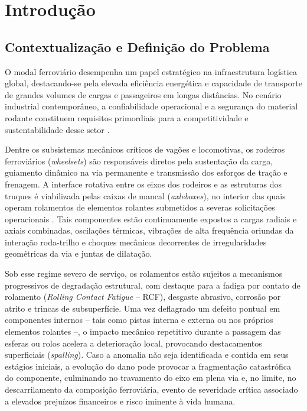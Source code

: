 \chapter{Introdução}
\label{cap:introducao}

\section{Contextualização e Definição do Problema}
\label{sec:contextualizacao}

O modal ferroviário desempenha um papel estratégico na infraestrutura logística global, destacando-se pela elevada eficiência energética e capacidade de transporte de grandes volumes de cargas e passageiros em longas distâncias. No cenário industrial contemporâneo, a confiabilidade operacional e a segurança do material rodante constituem requisitos primordiais para a competitividade e sustentabilidade desse setor \cite{smith2015rolling}.

Dentre os subsistemas mecânicos críticos de vagões e locomotivas, os rodeiros ferroviários (\textit{wheelsets}) são responsáveis diretos pela sustentação da carga, guiamento dinâmico na via permanente e transmissão dos esforços de tração e frenagem. A interface rotativa entre os eixos dos rodeiros e as estruturas dos truques é viabilizada pelas caixas de mancal (\textit{axleboxes}), no interior das quais operam rolamentos de elementos rolantes submetidos a severas solicitações operacionais \cite{randall2011rolling}. Tais componentes estão continuamente expostos a cargas radiais e axiais combinadas, oscilações térmicas, vibrações de alta frequência oriundas da interação roda-trilho e choques mecânicos decorrentes de irregularidades geométricas da via e juntas de dilatação.

Sob esse regime severo de serviço, os rolamentos estão sujeitos a mecanismos progressivos de degradação estrutural, com destaque para a fadiga por contato de rolamento (\textit{Rolling Contact Fatigue} -- RCF), desgaste abrasivo, corrosão por atrito e trincas de subsuperfície. Uma vez deflagrado um defeito pontual em componentes internos -- tais como pistas interna e externa ou nos próprios elementos rolantes --, o impacto mecânico repetitivo durante a passagem das esferas ou rolos acelera a deterioração local, provocando destacamentos superficiais (\textit{spalling}). Caso a anomalia não seja identificada e contida em seus estágios iniciais, a evolução do dano pode provocar a fragmentação catastrófica do componente, culminando no travamento do eixo em plena via e, no limite, no descarrilamento da composição ferroviária, evento de severidade crítica associado a elevados prejuízos financeiros e risco iminente à vida humana.

